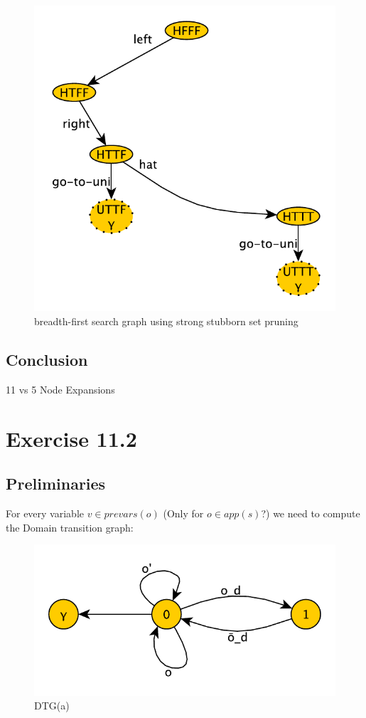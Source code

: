 \documentclass[11pt,a4paper]{article}
\begin{document}
\begin{figure}[h!]
\centering
\includegraphics[scale=0.7]{breadthFirstStrongStubborn}
\caption{breadth-first search graph using strong stubborn set pruning}
\end{figure}

\subsection*{Conclusion}
11 vs 5 Node Expansions

\section*{Exercise 11.2}

\subsection*{Preliminaries}
For every variable $ v \in prevars(o) $ (Only for $o \in app(s)$?) we need to compute the Domain transition graph:
\begin{figure}[h!]
\centering
\includegraphics[scale=0.5]{DTG_a}
\caption{DTG(a)}
\end{figure}
\end{document}

